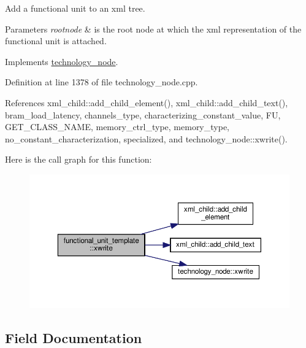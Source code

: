 Add a functional unit to an xml tree. 


\begin{DoxyParams}{Parameters}
{\em rootnode} & is the root node at which the xml representation of the functional unit is attached. \\
\hline
\end{DoxyParams}


Implements \hyperlink{structtechnology__node_a8ce6644a0b2700f760936e4c02754e2f}{technology\+\_\+node}.



Definition at line 1378 of file technology\+\_\+node.\+cpp.



References xml\+\_\+child\+::add\+\_\+child\+\_\+element(), xml\+\_\+child\+::add\+\_\+child\+\_\+text(), bram\+\_\+load\+\_\+latency, channels\+\_\+type, characterizing\+\_\+constant\+\_\+value, FU, G\+E\+T\+\_\+\+C\+L\+A\+S\+S\+\_\+\+N\+A\+ME, memory\+\_\+ctrl\+\_\+type, memory\+\_\+type, no\+\_\+constant\+\_\+characterization, specialized, and technology\+\_\+node\+::xwrite().

Here is the call graph for this function\+:
\nopagebreak
\begin{figure}[H]
\begin{center}
\leavevmode
\includegraphics[width=350pt]{d7/d24/structfunctional__unit__template_a3665d165eb3d912e2c46bf9e57006a40_cgraph}
\end{center}
\end{figure}


\subsection{Field Documentation}
\mbox{\label{structfunctional__unit__template_a5b26fda07926bc6ba68ab947bbae1274}} 
